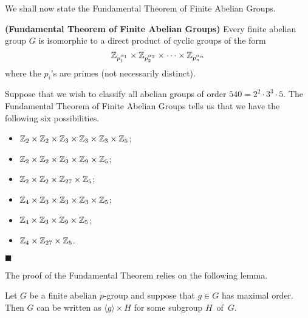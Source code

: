  
\vspace{2ex}
 
 
We shall now state the Fundamental Theorem of Finite Abelian Groups. 
 
 
\begin{theorem}
{\bf (Fundamental Theorem of Finite Abelian
Groups)} 
Every finite abelian group $G$ is isomorphic to a direct product of
cyclic groups of the form 
\[
{\Bbb Z}_{p_1^{ \alpha_1 }}
\times
{\Bbb Z}_{p_2^{ \alpha_2 }}
\times
\cdots
\times
{\Bbb Z}_{p_n^{ \alpha_n }}
\]
where the $p_i$'s are primes (not necessarily distinct).
\end{theorem}
 
 
Suppose that we wish to classify all abelian groups of order $540=2^2
\cdot 3^3 \cdot 5$.  The Fundamental Theorem of Finite Abelian Groups 
tells us that we have the following six possibilities.
\begin{itemize}
 
\item
${\Bbb Z}_2 \times {\Bbb Z}_2 \times {\Bbb Z}_3
\times {\Bbb Z}_3 \times {\Bbb Z}_3 \times {\Bbb Z}_5$;
 
\item
${\Bbb Z}_2 \times {\Bbb Z}_2 \times {\Bbb Z}_3
\times {\Bbb Z}_9 \times {\Bbb Z}_5$;
 
 
\item
${\Bbb Z}_2 \times {\Bbb Z}_2
\times {\Bbb Z}_{27} \times {\Bbb Z}_5$;
 
 
\item
${\Bbb Z}_4 \times {\Bbb Z}_3
\times {\Bbb Z}_3 \times {\Bbb Z}_3 \times {\Bbb Z}_5$;
 
\item
${\Bbb Z}_4 \times {\Bbb Z}_3
\times {\Bbb Z}_9 \times {\Bbb Z}_5$;
 
\item
${\Bbb Z}_4 \times {\Bbb Z}_{27} \times {\Bbb Z}_5$.
 
\end{itemize}
\hspace{\fill} $\blacksquare$
 
 
\vspace{2ex}
 
 
The  proof of the Fundamental Theorem relies on the following lemma.
 
 
 
\begin{lemma}
Let $G$ be a finite abelian $p$-group and suppose that $g \in G$ has
maximal order. Then $G$ can be written as $\langle g \rangle \times H$
for some subgroup $H$~of~$G$. 
\end{lemma}
 
